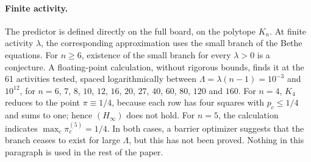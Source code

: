 \paragraph{Finite activity.}
The predictor is defined directly on the full board, on the polytope $K_n$. At finite
activity $\lambda$, the corresponding approximation uses the small branch of the Bethe equations.
For $n\ge6$, existence of the small branch for every $\lambda>0$ is a conjecture. A floating-point
calculation, without rigorous bounds, finds it at the 61 activities tested, spaced
logarithmically between $\Lambda=\lambda(n-1)=10^{-3}$ and $10^{12}$, for $n=6$, $7$, $8$, $10$, $12$,
$16$, $20$, $27$, $40$, $60$, $80$, $120$ and $160$. For $n=4$, $K_4$ reduces to the point
$\pi\equiv1/4$, because each row has four squares with $p_c\le1/4$ and sums to one; hence
$(H_\infty)$ does not hold. For $n=5$, the calculation indicates $\max_c\pi^{(5)}_c=1/4$. In both cases, a
barrier optimizer suggests that the branch ceases to exist for large $\Lambda$, but this has not been
proved.
Nothing in this paragraph is used in the rest of the paper.
